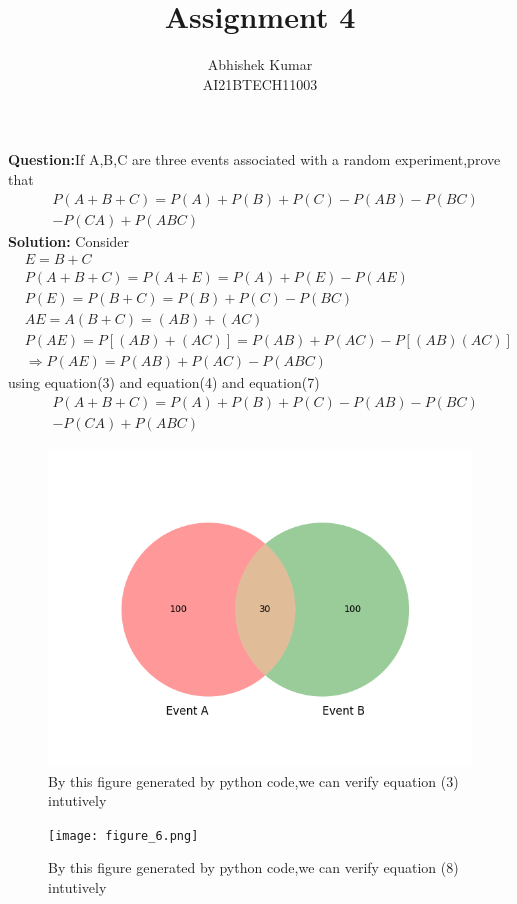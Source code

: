 \documentclass[journal, 8pt, twocolumn]{IEEEtran}
\title{Assignment 4 \\}
\author{Abhishek Kumar\\AI21BTECH11003}
\begin{document}
	\maketitle
	\textbf{Question:}If A,B,C are three events associated with a random experiment,prove that 
	\begin{align}
	&P(A+B+C)=P(A)+P(B)+P(C)-P(AB)-P(BC)\\\nonumber
	&-P(CA)+P(ABC)
	\end{align}
	\textbf{Solution:}
	Consider
	\begin{align}
	   &E=B+C \\ 
	   &P(A+B+C)=P(A+E)=P(A)+P(E)-P(AE)\\
    &P(E) = P(B+C)=P(B)+P(C)-P(BC)\\
    &AE = A(B+C) = (AB)+(AC)\\
    &P(AE)=P[(AB)+(AC)]=P(AB)+P(AC)-P[(AB)(AC)]\\
    &\Rightarrow P(AE) = P(AB)+P(AC) -P(ABC)
	\end{align}
	using equation(3) and equation(4) and equation(7)
	\begin{align}
	&P(A+B+C)=P(A)+P(B)+P(C)-P(AB)-P(BC)\\\nonumber
	&-P(CA)+P(ABC)
	\end{align}
	
	  \begin{figure}[h]
	    \centering
	    \includegraphics[scale=0.5]{figure_5.png}
	    \caption{By this figure generated by python code,we can verify equation (3) intutively}
	    \label{fig:my_label}
	\end{figure}
	
\begin{figure}[h]
	    \centering
	    \texttt{[image: figure\_6.png]}
	    \caption{By this figure generated by python code,we can verify equation (8) intutively}
	    \label{fig:my_label}
	\end{figure}
\end{document}
